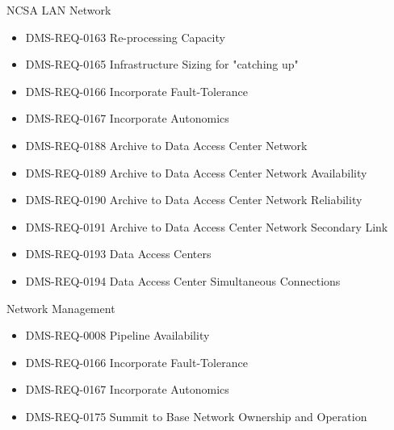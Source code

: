 NCSA LAN Network \begin{itemize}
\item DMS-REQ-0163 Re-processing Capacity
\item DMS-REQ-0165 Infrastructure Sizing for "catching up"
\item DMS-REQ-0166 Incorporate Fault-Tolerance
\item DMS-REQ-0167 Incorporate Autonomics
\item DMS-REQ-0188 Archive to Data Access Center Network
\item DMS-REQ-0189 Archive to Data Access Center Network Availability
\item DMS-REQ-0190 Archive to Data Access Center Network Reliability
\item DMS-REQ-0191 Archive to Data Access Center Network Secondary Link
\item DMS-REQ-0193 Data Access Centers
\item DMS-REQ-0194 Data Access Center Simultaneous Connections
\end{itemize}
Network Management \begin{itemize}
\item DMS-REQ-0008 Pipeline Availability
\item DMS-REQ-0166 Incorporate Fault-Tolerance
\item DMS-REQ-0167 Incorporate Autonomics
\item DMS-REQ-0175 Summit to Base Network Ownership and Operation
\end{itemize}
